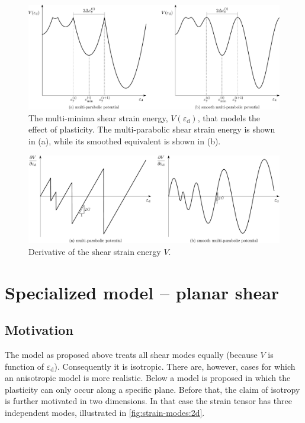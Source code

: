 \documentclass[fleqn]{goose-article}
\begin{document}
\begin{figure}[htp]
    \centering
    \includegraphics[width=1.\textwidth]{figures/potential_V-plas}
    \caption{
        The multi-minima shear strain energy, $V ( \varepsilon_\mathrm{d} )$,
        that models the effect of plasticity.
    The multi-parabolic shear strain energy is shown in (a),
    while its smoothed equivalent is shown in (b).}
    \label{fig:V:plas}
\end{figure}

\begin{figure}[htp]
    \centering
    \includegraphics[width=1.\textwidth]{figures/potential_dV-plas}
    \caption{Derivative of the shear strain energy $V$.}
    \label{fig:dV:plas}
\end{figure}

\section{Specialized model -- planar shear}

\subsection{Motivation}

The model as proposed above treats all shear modes equally
(because $V$ is function of $\varepsilon_\mathrm{d}$).
Consequently it is isotropic.
There are, however, cases for which an anisotropic model is more realistic.
Below a model is proposed in which the plasticity can only occur along a specific plane.
Before that, the claim of isotropy is further motivated in two dimensions.
In that case the strain tensor has three independent modes,
illustrated in \cref{fig:strain-modes:2d}.
\end{document}
